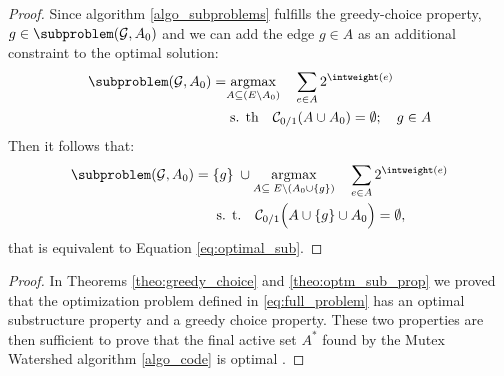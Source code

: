 \begin{proof}
Since algorithm \ref{algo_subproblems} fulfills the greedy-choice property, ${g\in \subproblem(\mathcal{G},A_0)}$ and we can add the edge $g \in A$ as an additional constraint to the optimal solution:
\begin{align}
\begin{split}
  \subproblem(\mathcal{G},A_0) = & \underset{A \subseteq (E \setminus A_0)}{\text{argmax}} \quad \sum_{e \in A} 2^{\intweight(e)} \\
  & \; \text{s. th} \quad  \mathcal{C}_{0/1}(A \cup A_0) = \emptyset; \quad g \in A \label{eq:optimal subproblem}
\end{split}
\end{align}
Then it follows that:
\begin{align}
\begin{split}
  \subproblem(\mathcal{G},A_0) = &\; \{g\} \; \cup \underset{A \subseteq \; E \setminus (A_0 \cup \{g\})}{\text{argmax}} \quad \sum_{e \in A} 2^{\intweight(e)} \\
   &\;\;\text{s. t.} \quad  \mathcal{C}_{0/1}\Big(A \cup \{g\} \cup A_0 \Big) = \emptyset,\label{eq:optimal subproblem}
\end{split}
\end{align}
that is equivalent to Equation \ref{eq:optimal_sub}.
\end{proof}

\Objective*
\begin{proof}
In Theorems \ref{theo:greedy_choice} and \ref{theo:optm_sub_prop} we proved that the optimization problem defined in \ref{eq:full_problem} has an optimal substructure property and a greedy choice property. 
These two properties are then sufficient to prove that the final active set $A^*$ found by the Mutex Watershed algorithm \ref{algo_code} is optimal \cite{cormen2009introduction}.
\end{proof}

